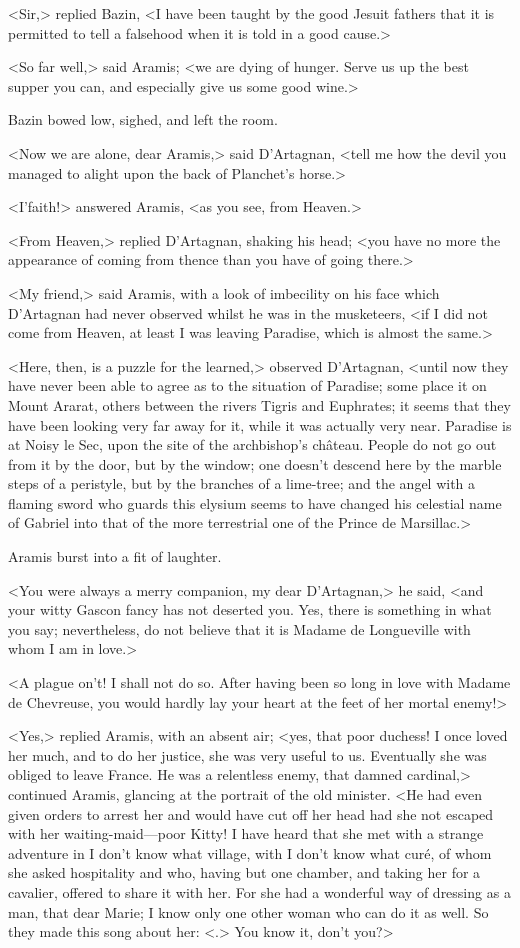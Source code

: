 <Sir,> replied Bazin, <I have been taught by the good Jesuit fathers that it is permitted to tell a falsehood when it is told in a good cause.>

<So far well,> said Aramis; <we are dying of hunger. Serve us up the best supper you can, and especially give us some good wine.>

Bazin bowed low, sighed, and left the room.

<Now we are alone, dear Aramis,> said D'Artagnan, <tell me how the devil you managed to alight upon the back of Planchet's horse.>

<I'faith!> answered Aramis, <as you see, from Heaven.>

<From Heaven,> replied D'Artagnan, shaking his head; <you have no more the appearance of coming from thence than you have of going there.>

<My friend,> said Aramis, with a look of imbecility on his face which D'Artagnan had never observed whilst he was in the musketeers, <if I did not come from Heaven, at least I was leaving Paradise, which is almost the same.>

<Here, then, is a puzzle for the learned,> observed D'Artagnan, <until now they have never been able to agree as to the situation of Paradise; some place it on Mount Ararat, others between the rivers Tigris and Euphrates; it seems that they have been looking very far away for it, while it was actually very near. Paradise is at Noisy le Sec, upon the site of the archbishop's château. People do not go out from it by the door, but by the window; one doesn't descend here by the marble steps of a peristyle, but by the branches of a lime-tree; and the angel with a flaming sword who guards this elysium seems to have changed his celestial name of Gabriel into that of the more terrestrial one of the Prince de Marsillac.>

Aramis burst into a fit of laughter.

<You were always a merry companion, my dear D'Artagnan,> he said, <and your witty Gascon fancy has not deserted you. Yes, there is something in what you say; nevertheless, do not believe that it is Madame de Longueville with whom I am in love.>

<A plague on't! I shall not do so. After having been so long in love with Madame de Chevreuse, you would hardly lay your heart at the feet of her mortal enemy!>

<Yes,> replied Aramis, with an absent air; <yes, that poor duchess! I once loved her much, and to do her justice, she was very useful to us. Eventually she was obliged to leave France. He was a relentless enemy, that damned cardinal,> continued Aramis, glancing at the portrait of the old minister. <He had even given orders to arrest her and would have cut off her head had she not escaped with her waiting-maid—poor Kitty! I have heard that she met with a strange adventure in I don't know what village, with I don't know what curé, of whom she asked hospitality and who, having but one chamber, and taking her for a cavalier, offered to share it with her. For she had a wonderful way of dressing as a man, that dear Marie; I know only one other woman who can do it as well. So they made this song about her: <.> You know it, don't you?>

